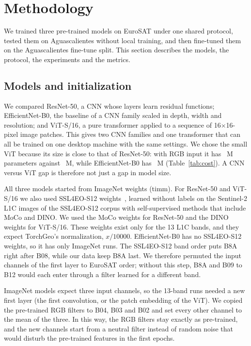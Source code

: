 \section{Methodology}\label{sec:methodology}

We trained three pre-trained models on EuroSAT under one shared protocol, tested them on
Aguascalientes without local training, and then fine-tuned them on the Aguascalientes fine-tune
split. This section describes the models, the protocol, the experiments and the metrics.

\subsection{Models and initialization}

We compared ResNet-50, a CNN whose layers learn residual functions;
EfficientNet-B0, the baseline of a CNN family scaled in depth, width
and resolution; and ViT-S/16, a pure transformer applied to a sequence
of 16$\times$16-pixel image patches. This gives two CNN families and one transformer that can
all be trained on one desktop machine with the same settings. We chose the small ViT because its
size is close to that of ResNet-50: with RGB input it has \ParamsViTRgb~M parameters against
\ParamsResNetRgb~M, while EfficientNet-B0 has \ParamsEffNetRgb~M (Table~\ref{tab:cost}). A CNN
versus ViT gap is therefore not just a gap in model size.

All three models started from ImageNet weights (timm). For ResNet-50 and
ViT-S/16 we also used SSL4EO-S12 weights~\cite{wang2023ssl4eo}, learned without labels on
the Sentinel-2 L1C images of the SSL4EO-S12 corpus with self-supervised methods that include MoCo
and DINO. We used the MoCo weights for ResNet-50 and the DINO weights for ViT-S/16. These
weights exist only for the 13 L1C bands, and they expect TorchGeo's normalization, $x/\num{10000}$. EfficientNet-B0 has no
SSL4EO-S12 weights, so it has only ImageNet runs. The SSL4EO-S12 band order puts B8A right after B08, while our data keep B8A
last. We therefore permuted the input channels of the first layer to EuroSAT order; without
this step, B8A and B09 to B12 would each enter through a filter learned for a different band.

ImageNet models expect three input channels, so the 13-band runs needed a new first layer (the
first convolution, or the patch embedding of the ViT). We copied the pre-trained RGB filters to
B04, B03 and B02 and set every other channel to the mean of the three. In this way, the RGB
filters stay exactly as pre-trained, and the new channels start from a neutral filter instead
of random noise that would disturb the pre-trained features in the first epochs.

